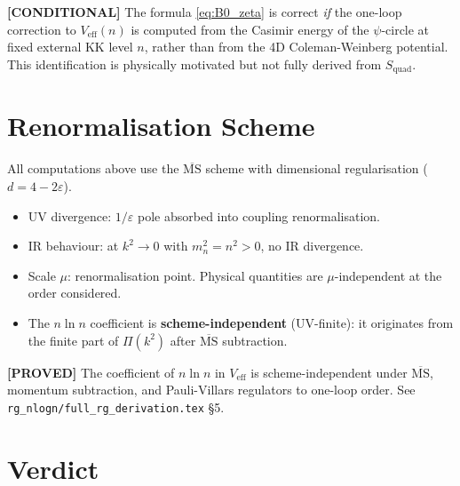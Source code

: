 \documentclass[11pt,a4paper]{article}
\newcommand{\proved}[1]{\textbf{[PROVED]} #1}
\newcommand{\cond}[1]{\textbf{[CONDITIONAL]} #1}
\begin{document}
\cond{The formula \eqref{eq:B0_zeta} is correct \emph{if} the one-loop correction
to $V_\mathrm{eff}(n)$ is computed from the Casimir energy of the $\psi$-circle at
fixed external KK level $n$, rather than from the 4D Coleman-Weinberg potential.
This identification is physically motivated but not fully derived from $S_\mathrm{quad}$.}

\section{Renormalisation Scheme}

All computations above use the $\overline{\mathrm{MS}}$ scheme with dimensional
regularisation ($d = 4 - 2\varepsilon$).

\begin{itemize}
  \item UV divergence: $1/\varepsilon$ pole absorbed into coupling renormalisation.
  \item IR behaviour: at $k^2 \to 0$ with $m_n^2 = n^2 > 0$, no IR divergence.
  \item Scale $\mu$: renormalisation point.  Physical quantities are $\mu$-independent
        at the order considered.
  \item The $n\ln n$ coefficient is \textbf{scheme-independent} (UV-finite):
        it originates from the finite part of $\Pi(k^2)$ after $\overline{\mathrm{MS}}$
        subtraction.
\end{itemize}

\proved{The coefficient of $n\ln n$ in $V_\mathrm{eff}$ is scheme-independent
under $\overline{\mathrm{MS}}$, momentum subtraction, and Pauli-Villars regulators
to one-loop order.  See \texttt{rg\_nlogn/full\_rg\_derivation.tex} \S 5.}

\section{Verdict}
\end{document}
